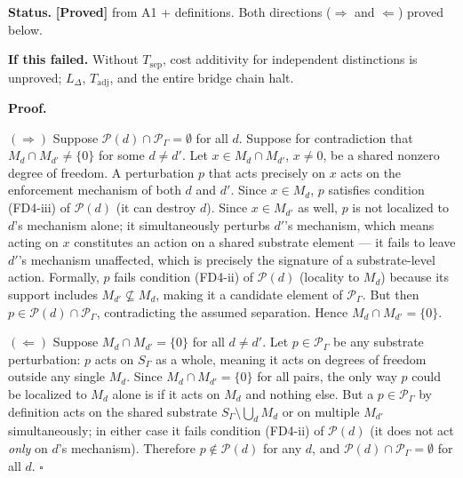 \documentclass[11pt]{article}
\theoremstyle{remark}
\begin{document}
\begin{tcolorbox}[apfbox, title={Theorem $T_{\mathrm{sep}}$ (Separation Biconditional)}]
\smallskip\noindent\textbf{Status.}  \textbf{[Proved]} from A1 + definitions.  Both directions ($\Rightarrow$ and $\Leftarrow$) proved below.

\smallskip\noindent\textbf{If this failed.}  Without $T_{\mathrm{sep}}$, cost additivity for independent distinctions is unproved; $L_\Delta$, $T_{\mathrm{adj}}$, and the entire bridge chain halt.

\smallskip\noindent\textbf{Proof.}

$(\Rightarrow)$  Suppose $\mathcal{P}(d) \cap \mathcal{P}_\Gamma = \emptyset$ for all $d$.  Suppose for contradiction that $M_d \cap M_{d'} \neq \{0\}$ for some $d \neq d'$.  Let $x \in M_d \cap M_{d'}$, $x \ne 0$, be a shared nonzero degree of freedom.  A perturbation $p$ that acts precisely on $x$ acts on the enforcement mechanism of both $d$ and $d'$.  Since $x \in M_d$, $p$ satisfies condition (FD4-iii) of $\mathcal{P}(d)$ (it can destroy $d$).  Since $x \in M_{d'}$ as well, $p$ is not localized to $d$'s mechanism alone; it simultaneously perturbs $d'$'s mechanism, which means acting on $x$ constitutes an action on a shared substrate element --- it fails to leave $d'$'s mechanism unaffected, which is precisely the signature of a substrate-level action.  Formally, $p$ fails condition (FD4-ii) of $\mathcal{P}(d)$ (locality to $M_d$) because its support includes $M_{d'} \not\subseteq M_d$, making it a candidate element of $\mathcal{P}_\Gamma$.  But then $p \in \mathcal{P}(d) \cap \mathcal{P}_\Gamma$, contradicting the assumed separation.  Hence $M_d \cap M_{d'} = \{0\}$.

$(\Leftarrow)$  Suppose $M_d \cap M_{d'} = \{0\}$ for all $d \neq d'$.  Let $p \in \mathcal{P}_\Gamma$ be any substrate perturbation: $p$ acts on $S_\Gamma$ as a whole, meaning it acts on degrees of freedom outside any single $M_d$.  Since $M_d \cap M_{d'} = \{0\}$ for all pairs, the only way $p$ could be localized to $M_d$ alone is if it acts on $M_d$ and nothing else.  But a $p \in \mathcal{P}_\Gamma$ by definition acts on the shared substrate $S_\Gamma \setminus \bigcup_d M_d$ or on multiple $M_{d'}$ simultaneously; in either case it fails condition (FD4-ii) of $\mathcal{P}(d)$ (it does not act \emph{only} on $d$'s mechanism).  Therefore $p \notin \mathcal{P}(d)$ for any $d$, and $\mathcal{P}(d) \cap \mathcal{P}_\Gamma = \emptyset$ for all $d$. \hfill$\square$


\end{tcolorbox}
\end{document}
